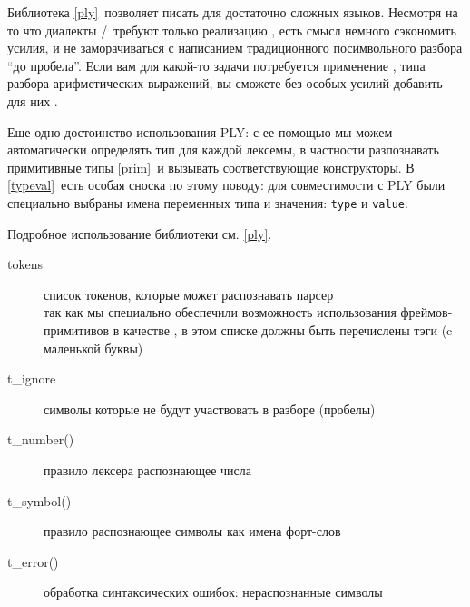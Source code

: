 \label{ply}

Библиотека  \ref{ply}\ позволяет писать  для достаточно
сложных языков. Несмотря на то что диалекты \F/\pyf\ требуют только реализацию
, есть смысл немного сэкономить усилия, и не заморачиваться с
написанием традиционного посимвольного разбора ``до пробела''. Если вам для
какой-то задачи потребуется применение , типа
разбора арифметических выражений, вы сможете без особых усилий добавить для них
.

Еще одно достоинство использования PLY: с ее помощью мы можем автоматически
определять тип для каждой лексемы, в частности разпознавать примитивные типы
\ref{prim}\ и вызывать соответствующие конструкторы. В \ref{typeval}\ есть
особая сноска по этому поводу: для совместимости с PLY были специально выбраны
имена переменных типа и значения: \verb|type| и \verb|value|.

Подробное использование библиотеки  см. \ref{ply}.

\clearpage
{}

\clearpage
\begin{description}%
\item[tokens] список токенов, которые может распознавать парсер\\
так как мы специально обеспечили возможность использования фрей\-мов-примитивов
в качестве , в этом списке должны быть перечислены тэги (c
маленькой буквы)
\item[t\_ignore] символы которые не будут участвовать в разборе (пробелы) 
\item[t\_number()] правило лексера распознающее числа
\item[t\_symbol()] правило распознающее символы как имена форт-слов
\item[t\_error()] обработка синтаксических ошибок: нераспознанные символы
\end{description}

{}
